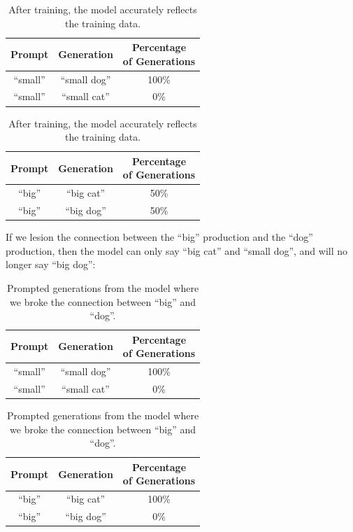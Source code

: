 \documentclass{article}
\begin{document}
\begin{table}[H]
\begin{center}
\begin{tabular}{ccc}
\hline\hline
Prompt & Generation &  \thead{Percentage \\ of Generations} \\[1ex]
\hline\hline
``small'' & ``small dog'' & 100\% \\
``small'' & ``small cat'' & 0\% \\
\hline
\end{tabular}
\quad\quad\quad
\begin{tabular}{ccc}
\hline\hline
Prompt & Generation &  \thead{Percentage \\ of Generations} \\[1ex]
\hline
``big'' & ``big cat'' & 50\% \\
``big'' & ``big dog'' & 50\% \\
\hline
\end{tabular}
\caption{After training, the model accurately reflects the training data.}
\end{center}
\end{table}

If we lesion the connection between the ``big'' production and the ``dog'' production, then the model can only say ``big cat'' and ``small dog'', and will no longer say ``big dog'':

\begin{table}[H]
\begin{center}
\begin{tabular}{ccc}
\hline\hline
Prompt & Generation &  \thead{Percentage \\ of Generations} \\[1ex]
\hline\hline
``small'' & ``small dog'' & 100\% \\
``small'' & ``small cat'' & 0\% \\
\hline
\end{tabular}
\quad\quad\quad
\begin{tabular}{ccc}
\hline\hline
Prompt & Generation &  \thead{Percentage \\ of Generations} \\[1ex]
\hline
``big'' & ``big cat'' & 100\% \\
``big'' & ``big dog'' & 0\% \\
\hline
\end{tabular}
\caption{Prompted generations from the model where we broke the connection between ``big'' and ``dog''.}
\end{center}
\end{table}
\end{document}
